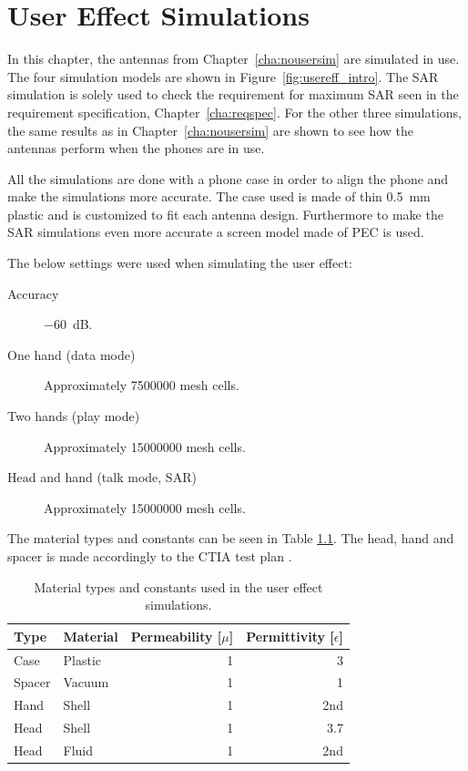 \chapter{User Effect Simulations}
\label{cha:usereff}
In this chapter, the antennas from Chapter~\ref{cha:nousersim} are simulated in use.
The four simulation models are shown in Figure~\ref{fig:usereff_intro}. The SAR simulation is solely used to check the requirement for maximum SAR seen in the requirement specification, Chapter~\ref{cha:reqspec}. For the other three simulations, the same results as in Chapter~\ref{cha:nousersim} are shown to see how the antennas perform when the phones are in use.

All the simulations are done with a phone case in order to align the phone and make the simulations more accurate. The case used is made of thin \SI{0.5}{mm} plastic and is customized to fit each antenna design. Furthermore to make the SAR simulations even more accurate a screen model made of PEC is used.  

The below settings were used when simulating the user effect:
\begin{description}
\item[Accuracy] \SI{-60}{dB}.
\item[One hand (data mode)] Approximately \num{7500000} mesh cells.
\item[Two hands (play mode)] Approximately \num{15000000} mesh cells.
\item[Head and hand (talk mode, SAR)] Approximately \num{15000000} mesh cells.
\end{description}

The material types and constants can be seen in Table \ref{tab:cst_material}. The head, hand and spacer is made accordingly to the CTIA test plan \cite{cita2015}.
\begin{table}
  \centering
  \begin{tabular}{|l|l|r|r|}
    \hline
    Type & Material & Permeability [$\mu$] & Permittivity [$\epsilon$] \\
    \hline
    Case      & Plastic  & 1    & 3       \\
    Spacer    & Vacuum   & 1    & 1       \\
    Hand      & Shell    & 1    & 2nd     \\
    Head      & Shell    & 1    & 3.7     \\
    Head      & Fluid    & 1    & 2nd     \\ 
    \hline
  \end{tabular}
  \caption{Material types and constants used in the user effect simulations.}
  \label{tab:cst_material}
\end{table}

